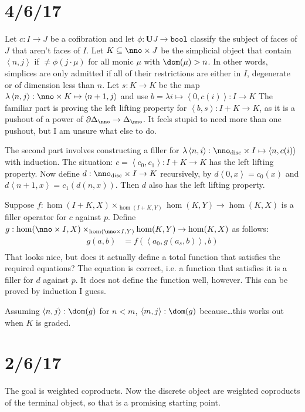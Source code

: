 \documentclass{tac}
\newcommand\of{:}
\newcommand\simplex\Delta
\newcommand\cycle{\partial\Delta}
\newcommand\tuplet[1]{\left\langle #1 \right\rangle}
\newcommand\bool{\mathtt{bool}}
\newcommand\base{\mathbf{U}}
\newcommand\disc{_{\rm disc}}
\newcommand\function[2]{\lambda #1 \mapsto #2}
\begin{document}
\section{4/6/17}
Let $c\of I\to J$ be a cofibration and let $\phi\of\base J\to\bool$ classify the subject of faces of $J$ that aren't faces of $I$.
Let $K\subseteq \nno\times J$ be the simplicial object that contain $\tuplet{n,j}$ if $\neq\phi(j\cdot\mu)$ for all monic $\mu$ with $\dom(\mu) > n$.
In other words, simplices are only admitted if all of their restrictions are either in $I$, degenerate or of dimension less than $n$.
Let $s\of K\to K$ be the map $\function{\tuplet{n,j}\of \nno\times K}\tuplet{n + 1,j}$ and use $b = \function i\tuplet{0,c(i)}\of I\to K$
The familiar part is proving the left lifting property for $\tuplet{b,s}\of I + K\to K$, as it is a pushout of a power of $\cycle_\nno \to \simplex_\nno$.
It feels stupid to need more than one pushout, but I am unsure what else to do.

The second part involves constructing a filler for $\function{\tuplet{n,i}\of \nno\disc\times I}\tuplet{n,c(i)}$ with induction.
The situation: $c=\tuplet{c_0,c_1}\of I + K\to K$ has the left lifting property. Now define $d\of\nno\disc\times I\to K$ recursively, by $d\tuplet{0,x} = c_0(x)$ and $d\tuplet{n + 1, x} = c_1(d(n,x))$. Then $d$ also has the left lifting property.

Suppose $f\of \hom(I+K,X)\times_{\hom(I+K,Y)}\hom(K,Y) \to \hom(K,X)$ is a filler operator for $c$ against $p$.
Define $g\of\hom(\nno\times I,X)\times_{\hom(\nno \times I,Y)}\hom(K,Y) \to \hom(K,X)$ as follows:
\begin{align*}
g(a,b) &= f(\tuplet{a_0,g(a_s,b)},b)\\
\end{align*}
That looks nice, but does it actually define a total function that satisfies the required equations?
The equation is correct, i.e. a function that satisfies it is a filler for $d$ against $p$. It does not define the function well, however.
This can be proved by induction I guess.

Assuming $\tuplet{n,j}\of\dom(g)$ for $n < m$, $\tuplet{m,j}\of\dom(g)$ because\dots this works out when $K$ is graded.

\section{2/6/17}
The goal is weighted coproducts. Now the discrete object are weighted coproducts of the terminal object, so that is a promising starting point.
\end{document}
